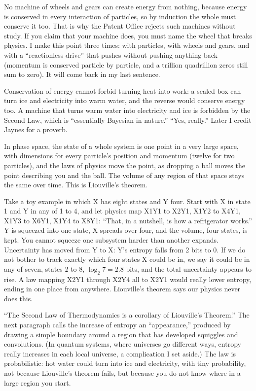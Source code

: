 
No machine of wheels and gears can create energy from nothing, because energy is conserved in every interaction of particles, so by induction the whole must conserve it too. That is why the Patent Office rejects such machines without study. If you claim that your machine does, you must name the wheel that breaks physics. I make this point three times: with particles, with wheels and gears, and with a ``reactionless drive'' that pushes without pushing anything back (momentum is conserved particle by particle, and a trillion quadrillion zeros still sum to zero). It will come back in my last sentence.

Conservation of energy cannot forbid turning heat into work: a sealed box can turn ice and electricity into warm water, and the reverse would conserve energy too. A machine that turns warm water into electricity and ice is forbidden by the Second Law, which is ``essentially Bayesian in nature.'' ``Yes, really.''  Later I credit Jaynes for a proverb.

In phase space, the state of a whole system is one point in a very large space, with dimensions for every particle's position and momentum (twelve for two particles), and the laws of physics move the point, as dropping a ball moves the point describing you and the ball. The volume of any region of that space stays the same over time. This is Liouville's theorem.

Take a toy example in which X has eight states and Y four. Start with X in state 1 and Y in any of 1 to 4, and let physics map X1Y1 to X2Y1, X1Y2 to X4Y1, X1Y3 to X6Y1, X1Y4 to X8Y1: ``That, in a nutshell, is how a refrigerator works.'' Y is squeezed into one state, X spreads over four, and the volume, four states, is kept. You cannot squeeze one subsystem harder than another expands. Uncertainty has moved from Y to X: Y's entropy falls from 2 bits to 0. If we do not bother to track exactly which four states X could be in, we say it could be in any of seven, states 2 to 8, $\log_2 7 = 2.8$ bits, and the total uncertainty appears to rise. A law mapping X2Y1 through X2Y4 all to X2Y1 would really lower entropy, ending in one place from anywhere. Liouville's theorem says our physics never does this.

``The Second Law of Thermodynamics is a corollary of Liouville's Theorem.'' The next paragraph calls the increase of entropy an ``appearance,'' produced by drawing a simple boundary around a region that has developed squiggles and convolutions. (In quantum systems, where universes go different ways, entropy really increases in each local universe, a complication I set aside.) The law is probabilistic: hot water could turn into ice and electricity, with tiny probability, not because Liouville's theorem fails, but because you do not know where in a large region you start.

